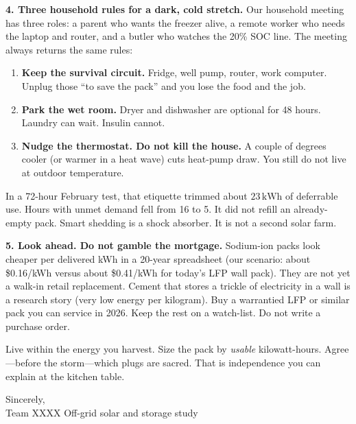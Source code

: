 \documentclass[11pt]{letter}
\begin{document}
\medskip
\noindent\textbf{4. Three household rules for a dark, cold stretch.}
Our household meeting has three roles: a parent who wants the freezer
alive, a remote worker who needs the laptop and router, and a butler
who watches the 20\% SOC line. The meeting always returns the same
rules:
\begin{enumerate}
  \item \textbf{Keep the survival circuit.} Fridge, well pump, router,
        work computer. Unplug those ``to save the pack'' and you lose
        the food and the job.
  \item \textbf{Park the wet room.} Dryer and dishwasher are optional
        for 48 hours. Laundry can wait. Insulin cannot.
  \item \textbf{Nudge the thermostat. Do not kill the house.} A couple
        of degrees cooler (or warmer in a heat wave) cuts heat-pump
        draw. You still do not live at outdoor temperature.
\end{enumerate}
In a 72-hour February test, that etiquette trimmed about
\(23\,\mathrm{kWh}\) of deferrable use. Hours with unmet demand fell
from 16 to 5. It did not refill an already-empty pack. Smart shedding
is a shock absorber. It is not a second solar farm.

\medskip
\noindent\textbf{5. Look ahead. Do not gamble the mortgage.}
Sodium-ion packs look cheaper per delivered kWh in a 20-year
spreadsheet (our scenario: about \$0.16/kWh versus about \$0.41/kWh for
today's LFP wall pack). They are not yet a walk-in retail replacement.
Cement that stores a trickle of electricity in a wall is a research
story (very low energy per kilogram). Buy a warrantied LFP or similar
pack you can service in 2026. Keep the rest on a watch-list. Do not
write a purchase order.

\medskip
\noindent
Live within the energy you harvest. Size the pack by \emph{usable}
kilowatt-hours. Agree---before the storm---which plugs are sacred.
That is independence you can explain at the kitchen table.

\vspace{0.9em}
\noindent
Sincerely,\\
Team XXXX \quad Off-grid solar and storage study
\end{document}
